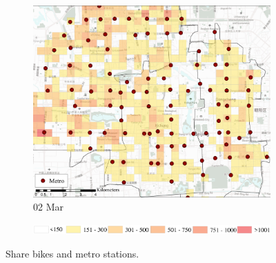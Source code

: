 \documentclass[preprints,ijgi,submit,moreauthors]{Definitions/mdpi}
\begin{document}
\begin{figure}[H]
\begin{subfigure}{.32\textwidth}
        \includegraphics[width=\textwidth]{Figures/Relation_with_POIs/POIsMetroD2020_03_02.pdf}
        \caption{02 Mar}
    \end{subfigure}

    \vspace{6pt}
    \begin{subfigure}{.7\textwidth}
        \includegraphics[width=\textwidth]{Figures/AppendixLegend2.eps}
    \end{subfigure}
    \caption{Share bikes and metro stations.}
    \label{fig:BSS_metro}
\end{figure}

\end{document}
